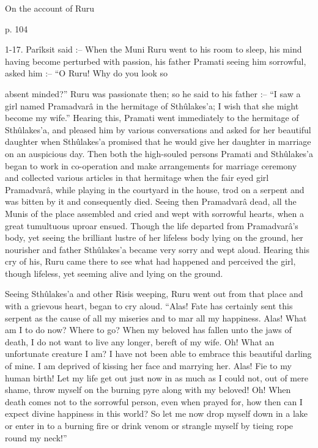 ﻿On the account of Ruru

 

p. 104

 

1-17. Parîksit said :-- When the Muni Ruru went to his room to sleep, his mind having become perturbed with passion, his father Pramati seeing him sorrowful, asked him :-- “O Ruru! Why do you look so

 

 

absent minded?” Ruru was passionate then; so he said to his father :-- “I saw a girl named Pramadvarâ in the hermitage of Sthûlakes'a; I wish that she might become my wife.” Hearing this, Pramati went immediately to the hermitage of Sthûlakes'a, and pleased him by various conversations and asked for her beautiful daughter when Sthûlakes'a  promised that he would give her daughter in marriage on an auspicious day. Then both the high-souled persons Pramati and Sthûlakes'a began to work in co-operation and make arrangements for marriage ceremony and collected various articles in that hermitage when the fair eyed girl Pramadvarâ, while playing in the courtyard in the house, trod on a serpent and was bitten by it and consequently died. Seeing then Pramadvarâ dead, all the Munis of the place assembled and cried and wept with sorrowful hearts, when a great tumultuous uproar ensued. Though the life departed from Pramadvarâ’s body, yet seeing the brilliant lustre of her lifeless body lying on the ground, her nourisher and father Sthûlakes'a became very sorry and wept aloud. Hearing this cry of his, Ruru came there to see what had happened and perceived the girl, though lifeless, yet seeming alive and lying on the ground.

 

Seeing Sthûlakes'a and other Risis weeping, Ruru went out from that place and with a grievous heart, began to cry aloud. “Alas! Fate has certainly sent this serpent as the cause of all my miseries and to mar all my happiness. Alas! What am I to do now? Where to go? When my beloved has fallen unto the jaws of death, I do not want to live any longer, bereft of my wife. Oh! What an unfortunate creature I am? I have not been able to embrace this beautiful darling of mine. I am deprived of kissing her face and marrying her. Alas! Fie to my human birth! Let my life get out just now in as much as I could not, out of mere shame, throw myself on the burning pyre along with my beloved! Oh! When death comes not to the sorrowful person, even when prayed for, how then can I expect divine happiness in this world? So let me now drop myself down in a lake or enter in to a burning fire or drink venom or strangle myself by tieing rope round my neck!”

